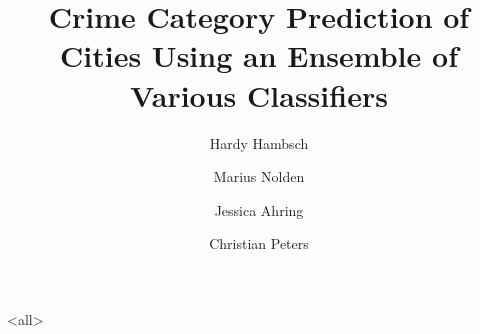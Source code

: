 \documentclass[ngerman, ignorenonframetext]{beamer}
\title[Crime Category Prediction of Cities]{Crime Category Prediction of Cities Using an Ensemble of Various Classifiers}
\author[Hambsch \and Nolden \and Ahring \and Peters] {
	Hardy Hambsch
	\and
	Marius Nolden
	\and
	Jessica Ahring
	\and
	Christian Peters
}
\begin{document}
	\mode<all>
	\begin{frame}
	\maketitle					%
	\end{frame}
	
	
	
	
	
    
	\begin{frame}[allowframebreaks] %
			\nocite{*}
			\printbibliography	%
	\end{frame}
	\mode*
\end{document}
